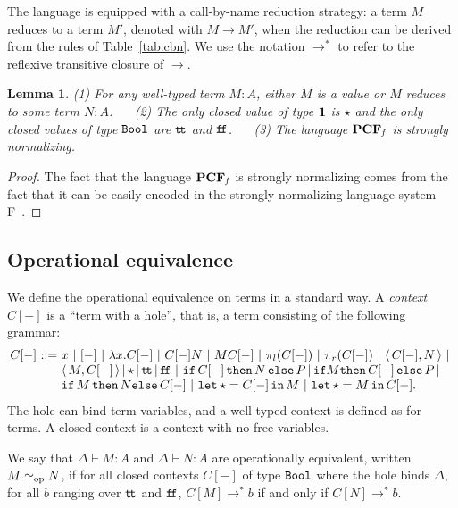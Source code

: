 \documentclass[10pt]{article}
\theoremstyle{plain}
\newtheorem{lemma}[theorem]{Lemma}
\theoremstyle{definition}
\newcommand{\entail}{\vdash}
\newcommand{\bor}{\ |\ }
\newcommand{\borsmall}{\,|\,}
\newcommand{\pair}[1]{{\langle\,{#1}\,\rangle}}
\newcommand{\punit}{{\star}}
\newcommand{\tunit}{{\bf 1}}
\newcommand{\ttrue}{{\tt t}\!{\tt t}}
\newcommand{\ffalse}{{\tt f}\!{\tt f}}
\newcommand{\ifterm}[3]{{{\tt if}\,{#1}\,{\tt then}\,{#2}\,{\tt else}\,{#3}}}
\newcommand{\letunit}[2]{{\tt let}\,\star={#1}\,{\tt in}\,{#2}}
\newcommand{\bit}{{\tt Bool}}
\newcommand{\opeq}{\mathrel{\simeq_{\rm op}}}
\begin{document}
The language is equipped with a call-by-name reduction strategy: a
term $M$ reduces to a term $M'$, denoted with $M\to M'$, when the
reduction can be derived from the rules of Table~\ref{tab:cbn}.
We use the notation $\to^*$ to refer to the reflexive transitive
closure of $\to$.



\begin{lemma}
  \label{lem:safety-prop}
  \label{lem:uniq-value}
  \label{lem:sn}
  (1) For any well-typed term $M:A$, either $M$ is a value or $M$ reduces
  to some term $N:A$. 
  ~~
  (2) The only closed value of type $\tunit$ is $\punit$ and the only
  closed values of type $\bit$ are $\ttrue$ and $\ffalse$.
  ~~
  (3) The language ${\bf PCF}_{\it f}$ is strongly normalizing.
\end{lemma}

\begin{proof}
  The fact that the language ${\bf PCF}_{\it f}$ is strongly
  normalizing comes from the fact that it can be easily encoded in the
  strongly normalizing language system F~\cite{sysF}.
\end{proof}




\subsection{Operational equivalence}
\label{sec:lc-cat}


We define the operational equivalence on terms in a standard way. A
{\em context $C[-]$} is a ``term with a hole'', that is, a
term consisting of the following grammar:
\[
\begin{array}{@{}l@{~}l@{~}l@{}}
  C[-] & {:}{:}{=} & 
  x \bor [-]\bor \lambda x.C[-] \bor C[-]N \bor MC[-] \bor\pi_l(C[-]) \bor
  \pi_r(C[-]) \bor
  \pair{C[-],N}\bor
  \\
  &&\pair{M,C[-]}\borsmall
  \punit\borsmall
  \ttrue \borsmall \ffalse \bor \ifterm{C[-]}{N}{P}\borsmall
  \ifterm{\!M\!}{C[-]}{P}\borsmall\\
  &&
  \ifterm{M}{N\!}{C[-]}\bor
  \letunit{C[-]}{M}\bor\letunit{M}{C[-]}.
\end{array}
\]
The hole can bind term variables, and a well-typed context is defined
as for terms. A closed context is a context with no free variables.

We say that $\Delta\entail M:A$ and $\Delta\entail N:A$ are
operationally equivalent, written $M\opeq N$, if for all closed
contexts $C[-]$ of type $\bit$ where the hole binds $\Delta$, for all
$b$ ranging over $\ttrue$ and $\ffalse$, $C[M]\to^* b$ if and only if
$ C[N]\to^* b $.
\end{document}
